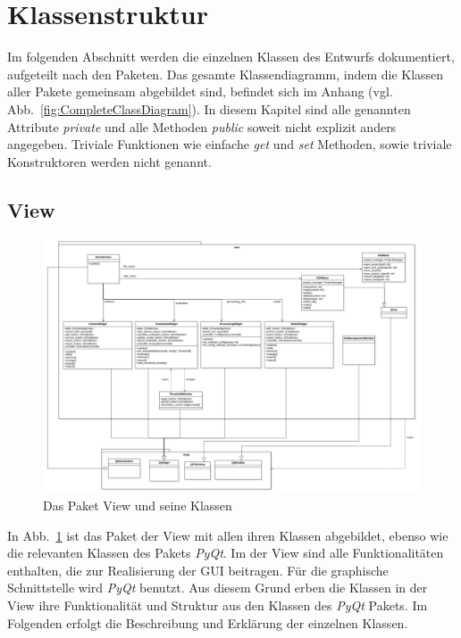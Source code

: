 \documentclass{article}
\begin{document}
\newpage
\section{Klassenstruktur}
Im folgenden Abschnitt werden die einzelnen Klassen des Entwurfs dokumentiert, aufgeteilt nach den Paketen. Das gesamte Klassendiagramm, indem die Klassen aller Pakete gemeinsam abgebildet sind, befindet sich im Anhang (vgl. Abb.~\ref{fig:CompleteClassDiagram}). In diesem Kapitel sind alle genannten Attribute \emph{private} und alle Methoden \emph{public} soweit nicht explizit anders angegeben. Triviale Funktionen wie einfache \emph{get} und \emph{set} Methoden, sowie triviale Konstruktoren werden nicht genannt.

\subsection{View}
\begin{figure}[H]%
    \centering
    \includegraphics[width=13cm]{entwurf/Entwurf_dokument/img/Alissa/ViewUpdated.png}
    \caption{Das Paket View und seine Klassen}
    \label{fig:classDiagrammView}
\end{figure}
In Abb.~\ref{fig:classDiagrammView} ist das Paket der View mit allen ihren Klassen abgebildet, ebenso wie die relevanten Klassen des Pakets \emph{PyQt}.
Im der View sind alle Funktionalitäten enthalten, die zur Realisierung der GUI beitragen. Für die graphische Schnittstelle wird \emph{PyQt} benutzt. Aus diesem Grund erben die Klassen in der View ihre Funktionalität und Struktur aus den Klassen des \emph{PyQt} Pakets. Im Folgenden erfolgt die Beschreibung und Erklärung der einzelnen Klassen.

\newpage
\end{document}

